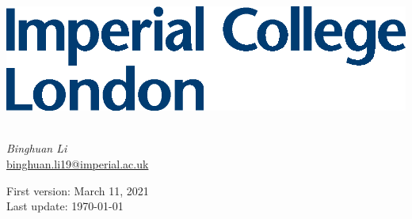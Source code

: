 \begin{titlepage}
\Large

\begin{minipage}{0.4\textwidth}
    \includegraphics[width=\textwidth]{images/Imperial.eps}
\end{minipage}

\vspace{1.5cm}

\begin{center}
        \vspace{2cm}
        {\Huge \textbf{\textit{\doc}}}\\
        \vspace{5cm}
        \textit{Binghuan Li}\\
        \href{mailto:binghuan.li19@imperial.ac.uk}{binghuan.li19@imperial.ac.uk}

        \vspace{3cm}
        First version: March 11, 2021 \\
        Last update: \today
        \vfill
\end{center}

\end{titlepage}